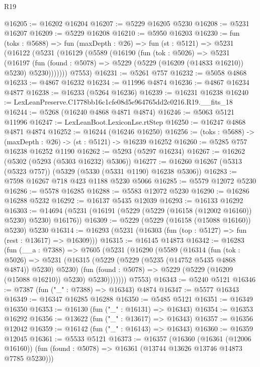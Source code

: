 \begin{lexlean}{R19}
\begin{coremodule}
@16205 := @16202 @16204
@16207 := @5229 @16205 @5230
@16208 := @5231 @16207
@16209 := @5229 @16208
@16210 := @5950 @16203
@16230 := fun (toks : @5688) =>
  fun (maxDepth : @26) =>
  fun (st : @5121) =>
  @5231
    (@16122
      (@5231
        (@16129
          (@5589
            (@16190
              (fun (tok : @5026) =>
              @5231
                (@16197
                  (fun (found : @5078) => @5229 (@5229 (@16209 (@14833 @16210)) @5230) @5230)))))))
      @7553)
@16231 := @5261 @757
@16232 := @5058 @4868
@16233 := @4867 @16232
@16234 := @11996 @4874
@16236 := @4867 @16234 @4877
@16238 := @16233 (@5264 @16236)
@16239 := @16231 @16238
@16240 := LexLeanPreserve.C1778bb16c1cfe08d5e964765dd2c0216.R19.__fits_18
@16244 := @5268 (@16240 @4868 @4871 @4874)
@16246 := @5063 @5121 @11996
@16247 := LexLeanBoot.LexiconLse.rtStep
@16250 := @16247 @4868 @4871 @4874
@16252 := @16244 (@16246 @16250)
@16256 := (toks : @5688) -> (maxDepth : @26) -> (st : @5121) -> @16239 @16252
@16260 := @5285 @757 @16238 @16252 @1190
@16262 := @5293 (@5297 @16234)
@16267 := @16262 (@5302 (@5293 (@5303 @16232) @5306))
@16277 := @16260 @16267 (@5313 (@5323 @757)) (@5329 (@5330 (@5331 @1190) @16238 @5306))
@16283 := @7598 @16267 @718 @423 @1188 @5230 @5066
@16285 := @5579 @12072 @5230
@16286 := @5578 @16285
@16288 := @5583 @12072 @5230
@16290 := @16286 @16288 @5232
@16292 := @16137 @5435 @12039
@16293 := @16133 @16292
@16303 := @14694 (@5231 (@16191 (@5229 (@5229 (@16158 (@12002 @16160)) @5230) @5230) @16176))
@16309 := @5229 (@5229 (@16158 (@15088 @16160)) @5230) @5230
@16314 := @16293 (@5231 (@16303 (fun (top : @5127) => fun (rest : @13617) => @16309)))
@16315 := @16145 @14873
@16342 := @16283
    (fun (__a : @7388) =>
    @7605
      (@5231
        (@16290
          (@5589
            (@16314
              (fun (tok : @5026) =>
              @5231
                (@16315
                  (@5229 (@5229 (@5235 (@14752 @5435 @4868 @4874)) @5230) @5230)
                  (fun (found : @5078) => @5229 (@5229 (@16209 (@15088 @16210)) @5230) @5230)))))))
      @7553)
@16343 := @5240 @5121
@16346 := @7387 (fun ("_" : @7388) => @16343) @4874
@16347 := @5577 @16343
@16349 := @16347 @16285 @16288
@16350 := @5485 @5121
@16351 := @16349 @16350
@16353 := @16130 (fun ("_" : @16131) => @16343)
@16354 := @16353 @16292
@16356 := @13622 (fun ("_" : @13617) => @16343)
@16357 := @16356 @12042
@16359 := @16142 (fun ("_" : @16143) => @16343)
@16360 := @16359 @12045
@16361 := @5533 @5121
@16373 := @16357
    (@16360
      (@16361 (@12006 @16160))
      (fun (found : @5078) => @16361 (@13744 @13626 @13746 @14873 @7785 @5230)))

\end{coremodule}
\end{lexlean}
